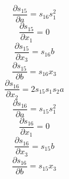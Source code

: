 \documentclass[10pt,a4paper]{article}
\begin{document}
\begin{dmath*}\frac{\partial s_{15}}{\partial a} = s_{16}  s_{1} ^ {2}\end{dmath*}
\begin{dmath*}\frac{\partial s_{15}}{\partial x_{1}} = 0\end{dmath*}
\begin{dmath*}\frac{\partial s_{15}}{\partial x_{3}} = s_{16}  b\end{dmath*}
\begin{dmath*}\frac{\partial s_{15}}{\partial b} = s_{16}  x_{3}\end{dmath*}
\begin{dmath*}\frac{\partial s_{16}}{\partial x_{2}} = 2  s_{15}  s_{1}  s_{2}  a\end{dmath*}
\begin{dmath*}\frac{\partial s_{16}}{\partial a} = s_{15}  s_{1} ^ {2}\end{dmath*}
\begin{dmath*}\frac{\partial s_{16}}{\partial x_{1}} = 0\end{dmath*}
\begin{dmath*}\frac{\partial s_{16}}{\partial x_{3}} = s_{15}  b\end{dmath*}
\begin{dmath*}\frac{\partial s_{16}}{\partial b} = s_{15}  x_{3}\end{dmath*}
\end{document}
